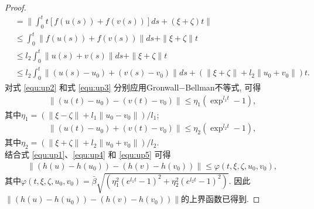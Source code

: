 \begin{proof}
\begin{align}
            \nonumber &=\|\int^t_0t[f(u(s))+f(v(s))]ds+(\xi+\zeta)t\|\\
            \nonumber &\leq\int^t_0\|f(u(s))+f(v(s))\|ds+\|\xi+\zeta\|t\\
            \nonumber &\leq l_2\int^t_0\|u(s)+v(s)\|ds+\|\xi+\zeta\|t\\
             &\leq l_2\int^t_0\|(u(s)-u_0)+(v(s)-v_0)\|ds+(\|\xi+\zeta\|+l_2\|u_0+v_0\|)t.
            \end{align}
        对式 \eqref{equ:up2} 和式 \eqref{equ:up3} 分别应用Gronwall$-$Bellman不等式, 可得
            \begin{align}\label{equ:up4}
            \|(u(t)-u_0)-(v(t)-v_0)\|\leq\eta_1(\exp^{l_1t}-1),
            \end{align}
       其中$\eta_1=(\|\xi-\zeta\|+l_1\|u_0-v_0\|)/l_1$;
            \begin{align}\label{equ:up5}
            \|(u(t)-u_0)+(v(t)-v_0)\|\leq\eta_2(\exp^{l_2t}-1),
            \end{align}
       其中$\eta_2=(\|\xi+\zeta\|+l_2\|u_0+v_0\|)/l_2$.\\
       结合式 \eqref{equ:up1}、\eqref{equ:up4} 和 \eqref{equ:up5} 可得
            \begin{align}\label{equ:up6}
            \|(h(u)-h(u_0))-(h(v)-h(v_0))\|\leq\varphi(t,\xi,\zeta,u_0,v_0),
            \end{align}
        其中$\varphi(t,\xi,\zeta,u_0,v_0)=\bar{\beta}\sqrt{(\eta_1^2(e^{l_1t}-1)^2+\eta_2^2(e^{l_2t}-1)^2)}$.
        因此$\|(h(u)-h(u_0))-(h(v)-h(v_0))\|$的上界函数已得到.


\end{proof}
